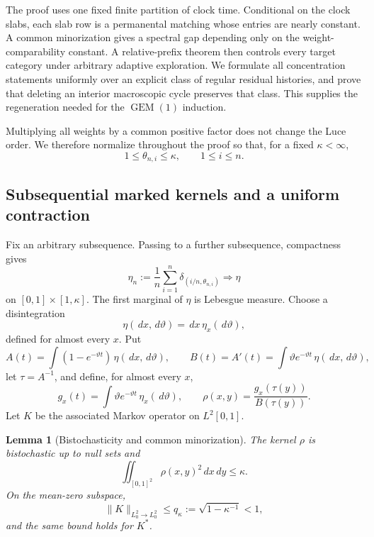 \documentclass[11pt]{article}
\newtheorem{lemma}[theorem]{Lemma}
\theoremstyle{remark}
\newcommand{\dd}{\,d}
\begin{document}
The proof uses one fixed finite partition of clock time.  Conditional on the
clock slabs, each slab row is a permanental matching whose entries are nearly
constant.  A common minorization gives a spectral gap depending only on the
weight-comparability constant.  A relative-prefix theorem then controls every
target category under arbitrary adaptive exploration.  We formulate all
concentration statements uniformly over an explicit class of regular residual
histories, and prove that deleting an interior macroscopic cycle preserves that
class.  This supplies the regeneration needed for the $\operatorname{GEM}(1)$
induction.

Multiplying all weights by a common positive factor does not change the Luce
order.  We therefore normalize throughout the proof so that, for a fixed
$\kappa<\infty$,
\begin{equation}
        1\le\theta_{n,i}\le\kappa,
        \qquad 1\le i\le n.
        \tag{6.0}\label{eq:pd-normalized-rates}
\end{equation}

\subsection{Subsequential marked kernels and a uniform contraction}

Fix an arbitrary subsequence.  Passing to a further subsequence, compactness
gives
\[
 \eta_n:=\frac1n\sum_{i=1}^n\delta_{(i/n,\theta_{n,i})}
 \Longrightarrow\eta
\]
on $[0,1]\times[1,\kappa]$.  The first marginal of $\eta$ is Lebesgue
measure.  Choose a disintegration
\[
        \eta(\dd x,\dd\vartheta)=\dd x\,\eta_x(\dd\vartheta),
\]
defined for almost every $x$.  Put
\[
 A(t)=\int(1-e^{-\vartheta t})\,\eta(\dd x,\dd\vartheta),
 \qquad
 B(t)=A'(t)=\int\vartheta e^{-\vartheta t}\,
 \eta(\dd x,\dd\vartheta),
\]
let $\tau=A^{-1}$, and define, for almost every $x$,
\[
 g_x(t)=\int\vartheta e^{-\vartheta t}\,\eta_x(\dd\vartheta),
 \qquad
 \rho(x,y)=\frac{g_x(\tau(y))}{B(\tau(y))}.
\]
Let $K$ be the associated Markov operator on $L^2[0,1]$.

\begin{lemma}[Bistochasticity and common minorization]
\label{lem:pd-kernel-contraction}
The kernel $\rho$ is bistochastic up to null sets and
\[
        \iint_{[0,1]^2}\rho(x,y)^2\dd x\dd y\le\kappa.
\]
On the mean-zero subspace,
\[
        \|K\|_{L^2_0\to L^2_0}
        \le q_\kappa:=\sqrt{1-\kappa^{-1}}<1,
\]
and the same bound holds for $K^*$.
\end{lemma}
\end{document}
